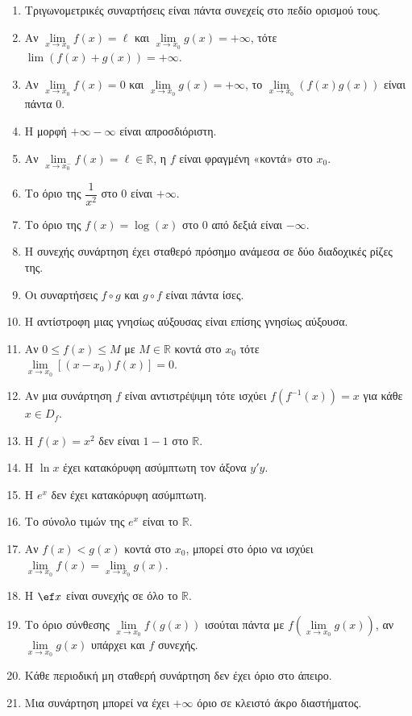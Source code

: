 \documentclass[11pt,a4paper]{article}
\begin{document}
\begin{enumerate}[label=\textbf{1.\arabic*.}]
    \item Τριγωνομετρικές συναρτήσεις είναι πάντα συνεχείς στο πεδίο ορισμού τους.
    \item Αν $\lim\limits_{x\to x_0} f(x) = \ell$ και $\lim\limits_{x\to x_0} g(x) = +\infty$, τότε $\lim (f(x)+g(x)) = +\infty$.
    \item Αν $\lim\limits_{x\to x_0} f(x) = 0$ και $\lim\limits_{x\to x_0} g(x) = +\infty$, το $\lim\limits_{x\to x_0} (f(x)g(x))$ είναι πάντα 0.
    \item Η μορφή $+\infty - \infty$ είναι απροσδιόριστη.
    \item Αν $\lim\limits_{x\to x_0^-} f(x) = \ell \in \mathbb{R}$, η $f$ είναι φραγμένη «κοντά» στο $x_0$.
    \item Το όριο της $\dfrac{1}{x^2}$ στο 0 είναι $+\infty$.
    \item Το όριο της $f(x)=\log(x)$ στο 0 από δεξιά είναι $-\infty$.
    \item H συνεχής συνάρτηση έχει σταθερό πρόσημο ανάμεσα σε δύο διαδοχικές ρίζες της.
    \item Οι συναρτήσεις $f\circ g$ και $g\circ f$ είναι πάντα ίσες.
    \item H αντίστροφη μιας γνησίως αύξουσας είναι επίσης γνησίως αύξουσα.
    \item Αν $0\leq f(x)\leq M$ με $M\in\mathbb{R}$ κοντά στο $x_0$ τότε $\lim\limits_{x\to x_0}{\left[(x-x_0)f(x)\right]}=0$.
    \item Αν μια συνάρτηση $f$ είναι αντιστρέψιμη τότε ισχύει $f(f^{-1}(x))=x$ για κάθε $x\in D_f$.
    \item H $f(x)=x^2$ δεν είναι $1-1$ στο $\mathbb{R}$.
    \item H $\ln x$ έχει κατακόρυφη ασύμπτωτη τον άξονα $y'y$.
    \item H $e^x$ δεν έχει κατακόρυφη ασύμπτωτη.
    \item Το σύνολο τιμών της $e^x$ είναι το $\mathbb{R}$.
    \item Αν $f(x)<g(x)$ κοντά στο $x_0$, μπορεί στο όριο να ισχύει $\lim\limits_{x\to x_0} f(x) = \lim\limits_{x\to x_0} g(x)$.
    \item H $\ef x$ είναι συνεχής σε όλο το $\mathbb{R}$.
    \item Το όριο σύνθεσης $\lim\limits_{x\to x_0} f(g(x))$ ισούται πάντα με $f(\lim\limits_{x\to x_0} g(x))$, αν $\lim\limits_{x\to x_0} g(x)$ υπάρχει και $f$ συνεχής.
    \item Κάθε περιοδική μη σταθερή συνάρτηση δεν έχει όριο στο άπειρο.
    \item Μια συνάρτηση μπορεί να έχει $+\infty$ όριο σε κλειστό άκρο διαστήματος.

\end{enumerate}
\end{document}
